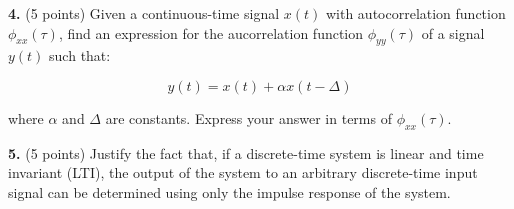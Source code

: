 \documentclass[a4paper,11pt,oneside]{article}
\begin{document}
\vspace{1cm}

\noindent \textbf{4.} (5 points) Given a continuous-time signal $x(t)$ with autocorrelation function $\phi_{xx}(\tau)$, find an expression for the aucorrelation function $\phi_{yy}(\tau)$ of a signal $y(t)$ such that:

\[
y(t) = x(t)+\alpha x(t-\Delta)
\]

\noindent where $\alpha$ and $\Delta$ are constants. Express your answer in terms of $\phi_{xx}(\tau)$.

\vspace{1cm}

\noindent \textbf{5.} (5 points) Justify the fact that, if a discrete-time system is linear and time invariant (LTI), the output of the system to an arbitrary discrete-time input signal can be determined using only the impulse response of the system.  
\end{document}
